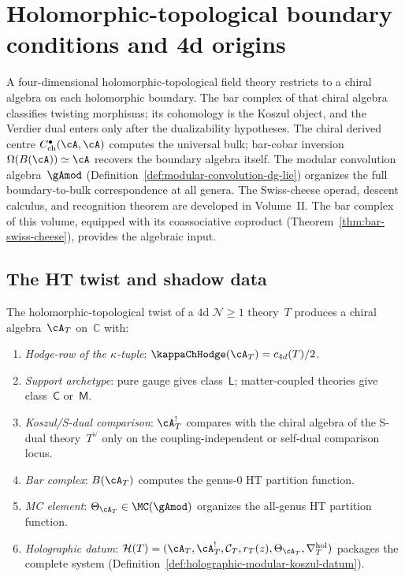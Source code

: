 \chapter{Holomorphic-topological boundary conditions and 4d origins}
\label{ch:ht-boundary}


A four-dimensional holomorphic-topological field theory restricts to a
chiral algebra on each holomorphic boundary. The bar complex of that
chiral algebra classifies twisting morphisms; its cohomology is the
Koszul object, and the Verdier dual enters only after the dualizability
hypotheses. The chiral derived centre
$C^\bullet_{\mathrm{ch}}(\cA,\cA)$ computes the universal
bulk; bar-cobar inversion $\Omega(B(\cA)) \simeq \cA$
recovers the boundary algebra itself. The modular
convolution algebra~$\gAmod$
(Definition~\ref{def:modular-convolution-dg-lie}) organizes the full boundary-to-bulk correspondence
at all genera. The Swiss-cheese operad, descent
calculus, and recognition theorem are developed in Volume~II\@. The bar complex of
this volume, equipped with its coassociative coproduct
(Theorem~\ref{thm:bar-swiss-cheese}), provides the algebraic input.

\section{The HT twist and shadow data}
\label{sec:ht-shadow-data}

\begin{construction}
\label{constr:ht-shadow-data}
The holomorphic-topological twist of a $4$d $\mathcal{N} \geq 1$
theory~$T$ produces a chiral algebra~$\cA_T$ on~$\mathbb{C}$ with:
\begin{enumerate}[label=\textup{(\roman*)}]
\item \emph{Hodge-row of the $\kappa$-tuple}:
 $\kappaChHodge(\cA_T) = c_{4d}(T)/2$.
\item \emph{Support archetype}: pure gauge gives
 class~$\mathsf{L}$; matter-coupled theories give
 class~$\mathsf{C}$ or~$\mathsf{M}$.
\item \emph{Koszul/S-dual comparison}: $\cA_T^!$ compares with the
 chiral algebra of the S-dual theory~$T^\vee$ only on the
 coupling-independent or self-dual comparison locus.
\item \emph{Bar complex}: $B(\cA_T)$ computes the genus-$0$ HT
 partition function.
\item \emph{MC element}:
 $\Theta_{\cA_T} \in \MC(\gAmod)$ organizes the all-genus
 HT partition function.
\item \emph{Holographic datum}:
 $\mathcal{H}(T) = (\cA_T, \cA_T^!, \mathcal{C}_T, r_T(z),
 \Theta_{\cA_T}, \nabla^{\mathrm{hol}}_T)$ packages the complete
 system
 \textup{(}Definition~\textup{\ref{def:holographic-modular-koszul-datum}}\textup{)}.
\end{enumerate}
\end{construction}

